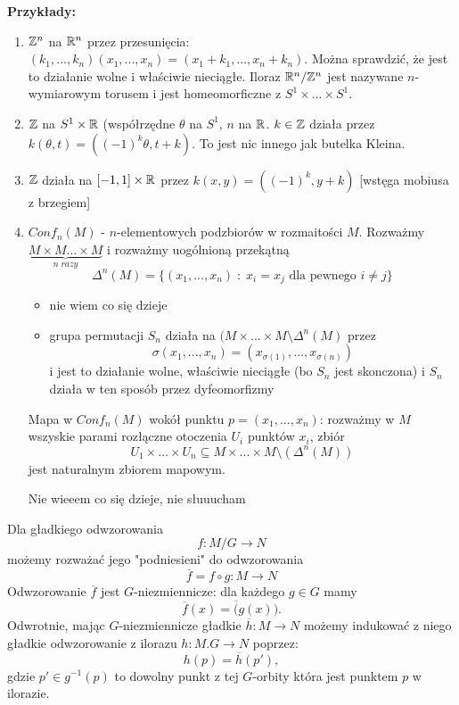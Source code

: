 \textbf{Przykłady:} 
\begin{enumerate}
\item $\mathbb{Z}^n$ na $\mathbb{R}^n$ przez przesunięcia: $(k_1,...,k_n)(x_1,...,x_n)=(x_1+k_1,...,x_n+k_n)$. Można sprawdzić, że jest to działanie wolne i właściwie nieciągłe. Iloraz $\mathbb{R}^n/\mathbb{Z}^n$ jest nazywane $n$-wymiarowym torusem i jest homeomorficzne z $S^1\times...\times S^1$.
\item $\mathbb{Z}$ na $S^1\times\mathbb{R}$ (współrzędne $\theta$ na $S^1$, $n$ na $\mathbb{R}$. $k\in\mathbb{Z}$ działa przez $k(\theta,t)=((-1)^k\theta,t+k)$. To jest nic innego jak butelka Kleina.
\item $\mathbb{Z}$ działa na $[-1,1]\times\mathbb{R}$ przez $k(x,y)=((-1)^k,y+k)$ [wstęga mobiusa z brzegiem]
\item $Conf_n(M)$ -  $n$-elementowych podzbiorów w rozmaitości $M$. Rozważmy $\underbrace{M\times M...\times M}_{n\;razy}$ i rozważmy uogólnioną przekątną 
$$\Delta^n(M)=\{(x_1,...,x_n)\;:\;x_i=x_j\text{ dla pewnego }i\neq j\}$$
    \begin{itemize}
        \item nie wiem co się dzieje
        \item grupa permutacji $S_n$ działa na $(M\times...\times M\setminus\Delta^n(M)$ przez 
        $$\sigma(x_1,...,x_n)=(x_{\sigma(1)},...,x_{\sigma(n)})$$
        i jest to działanie wolne, właściwie nieciągłe (bo $S_n$ jest skonczona) i $S_n$ działa w ten sposób przez dyfeomorfizmy
    \end{itemize}

Mapa w $Conf_n(M)$ wokół punktu $p=(x_1,...,x_n)$: rozważmy w $M$ wszyskie parami rozłączne otoczenia $U_i$ punktów $x_i$, zbiór 
$$U_1\times...\times U_n\subseteq M\times...\times M\setminus(\Delta^n(M))$$
jest naturalnym zbiorem mapowym.

{\large\color{orange}Nie wieeem co się dzieje, nie słuuucham}
\end{enumerate}

\begin{remark}
Dla gładkiego odwzorowania
$$f:M/G\to N$$
możemy rozważać jego "podniesieni" do odwzorowania
$$\overline{f}=f\circ g:M\to N$$
Odwzorowanie $\overline{f}$ jest $G$-niezmiennicze: dla każdego $g\in G$ mamy
$$\overline{f}(x)=\overline(g(x)).$$
Odwrotnie, mając $G$-niezmiennicze gładkie $\overline{h}:M\to N$ możemy indukować z niego gładkie odwzorowanie z ilorazu $h:M.G\to N$ poprzez:
$$h(p)=\overline{h}(p'),$$
gdzie $p'\in g^{-1}(p)$ to dowolny punkt z tej $G$-orbity która jest punktem $p$ w ilorazie.
\end{remark}

